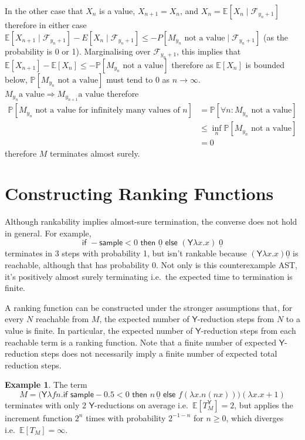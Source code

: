 \documentclass{article}
\newcommand\expect[1]{\mathbb{E}[#1]}
\newcommand{\tY}{\textsf{Y}}
\newcommand{\tif}[3]{\textsf{if }#1\textsf{ then }#2\textsf{ else }#3}
\newcommand{\tsample}{\textsf{sample}}
\theoremstyle{definition}
\newtheorem{example}{Example}
\theoremstyle{lemma}
\theoremstyle{remark}
\begin{document}
In the other case that $X_n$ is a value, $X_{n+1} = X_n$, and $X_n = \mathbb E[X_n \mid \mathcal F_{y_n+1}]$ therefore in either case $\mathbb E[X_{n+1} \mid \mathcal F_{y_n+1}] - E[X_n \mid \mathcal F_{y_n+1}] \leq \mathbb -P[M_{y_n} \text{ not a value} \mid \mathcal F_{y_n+1}]$ (as the probability is 0 or 1). Marginalising over $\mathcal F_{y_n+1}$, this implies that $\mathbb{E}[X_{n+1}] - \mathbb{E}[X_{n}] \leq -\mathbb P[M_{y_n} \text{ not a value}]$ therefore as $\mathbb{E}[X_n]$ is bounded below, $\mathbb P[M_{y_n} \text{ not a value}]$ must tend to 0 as $n \to \infty$. $M_{y_n} \text{a value} \Rightarrow M_{y_{n+1}} \text{a value}$ therefore 
\begin{align*}
\mathbb P[M_{y_n} \text{ not a value for infinitely many values of $n$}]  
& = \mathbb P[\forall n: M_{y_n} \text{ not a value}] \\
& \leq \inf_n \mathbb P[M_{y_n} \text{ not a value}] \\
& = 0
\end{align*} 
therefore $M$ terminates almost surely.



\section{Constructing Ranking Functions}
Although rankability implies almost-sure termination, the converse does not hold in general. For example,
\begin{equation}
\tif{{-}\tsample < 0}{\underline{0}}{(\tY \lambda x. x) \; \underline 0}
\label{ex:0 probability reachable}
\end{equation}
terminates in 3 steps with probability 1, but isn't rankable because $(\tY \lambda x. x) \underline 0$ is reachable, although that has probability 0. 
Not only is this counterexample AST, it's positively almost surely terminating i.e.~the expected time to termination is finite.

A ranking function can be constructed under the stronger assumptions that, for every $N$ reachable from $M$, the expected number of $\tY$-reduction steps from $N$ to a value is finite. In particular, the expected number of $\tY$-reduction steps from each reachable term is a ranking function. Note that a finite number of expected $\tY$-reduction steps does not necessarily imply a finite number of expected total reduction steps.

\begin{example}
\label{ex:tY finite does not imply t finite}
The term
\[
M = \big(\tY \lambda f n. \tif{\tsample - 0.5 < 0}{n \, \underline 0}{f (\lambda x. n (n x))}\big) (\lambda x. x+1)
\] 
terminates with only 2 $\tY$-reductions on average i.e.~$\expect{T_M^\tY} = 2$, but applies the increment function $2^n$ times with probability $2^{-1-n}$ for $n \geq 0$, which diverges i.e.~$\expect{T_M} = \infty$.
\end{example}
\end{document}
